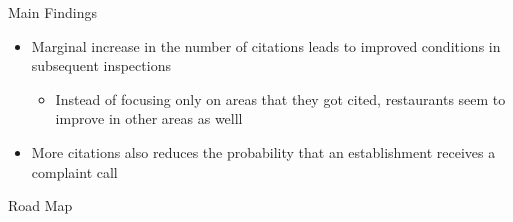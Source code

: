 \documentclass[handout]{beamer}
\begin{document}
\begin{frame}{Main Findings}
\begin{itemize}
\item Marginal increase in the number of citations leads to improved conditions in subsequent inspections
\begin{itemize}
\item Instead of focusing only on areas that they got cited, restaurants seem to improve in other areas as welll
\end{itemize}
\item More citations also reduces the probability that an establishment receives a complaint call
\end{itemize}
\end{frame}

\begin{frame}{Road Map}
\tableofcontents
\end{frame}

\end{document}
